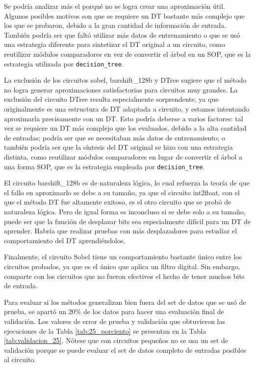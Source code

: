 Se podría analizar más el porqué no se logra crear una aproximación útil.
Algunos posibles motivos son que se requiere un DT bastante más complejo que
los que se probaron, debido a la gran cantidad de información de entrada.
También podría ser que faltó utilizar más datos de entrenamiento o que se usó
una estrategia diferente para sintetizar el DT original a un circuito, como
reutilizar módulos comparadores en vez de convertir el árbol en un SOP, que es
la estrategia utilizada por \texttt{decision\_tree}.

La exclusión de los circuitos sobel, barshift\_128b y DTree sugiere que el
método no logra generar aproximaciones satisfactorias para circuitos muy
grandes. La exclusión del circuito DTree resulta especialmente sorprendente, ya
que originalmente es una estructura de DT adaptada a circuito, y estamos
intentando aproximarla precisamente con un DT. Esto podría deberse a varios
factores: tal vez se requiere un DT más complejo que los evaluados,
debido a la alta cantidad de entradas; podría ser que se necesitaban más datos
de entrenamiento; o también podría ser que la síntesis del DT original se hizo
con una estrategia distinta, como reutilizar módulos comparadores en lugar de
convertir el árbol a una forma SOP, que es la estrategia empleada por
\texttt{decision\_tree}.


El circuito barshift\_128b es de naturaleza lógica, lo cual refuerza la teoría
de que el fallo en aproximarlo se debe a su tamaño, ya que el circuito
int2float, con el que el método DT fue altamente exitoso, es el otro circuito
que se probó de naturaleza lógica. Pero de igual forma es inconcluso si se debe
solo a su tamaño, puede ser que la función de desplazar bits sea especialmente
difícil para un DT de aprender. Habría que realizar pruebas con más
desplazadores para estudiar el comportamiento del DT aprendiéndolos.

Finalmente, el circuito Sobel tiene un comportamiento bastante único entre los
circuitos probados, ya que es el único que aplica un filtro digital. Sin
embargo, comparte con los circuitos que no fueron efectivos el hecho de tener
muchos bits de entrada.

Para evaluar si los métodos generalizan bien fuera del set de datos que se usó
de prueba, se apartó un 20\% de los datos para hacer una evaluación final de
validación. Los valores de error de prueba y validación que obtuvieron las
ejecuciones de la Tabla \ref{tab:25_porciento} se presentan en la Tabla
\ref{tab:validacion_25}. Nótese que con circuitos pequeños no se usa un set de
validación porque se puede evaluar el set de datos completo de entradas
posibles al circuito.

